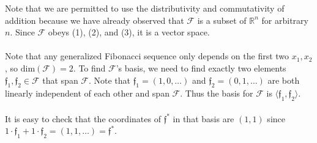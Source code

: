 \documentclass{article}
\begin{document}
Note that we are permitted to use the distributivity and commutativity of addition because we have already observed that $\mathcal{F}$ is a subset of $\mathbb{R}^{n}$ for arbitrary $n$. Since $\mathcal{F}$ obeys (1), (2), and (3), it is a vector space. \\\\
 Note that any generalized Fibonacci sequence only depends on the first two $x_{1},x_{2}$, so $\text{dim}(\mathcal{F}) = 2$. To find $\mathcal{F}$'s basis, we need to find exactly two elements $\mathfrak{f}_{1},\mathfrak{f}_{2} \in \mathcal{F}$ that span $\mathcal{F}$. Note that $\mathfrak{f}_{1} = (1, 0, \dots)$ and $\mathfrak{f}_{2} = (0, 1, \dots)$ are both linearly independent of each other and span $\mathcal{F}$. Thus the basis for $\mathcal{F}$ is $\langle \mathfrak{f}_{1}, \mathfrak{f}_{2}\rangle$. \\\\
 It is easy to check that the coordinates of $\mathfrak{f}^{*}$ in that basis are $(1,1)$ since $1\cdot\mathfrak{f}_{1} + 1\cdot\mathfrak{f}_{2} = (1,1, \dots) = \mathfrak{f}^{*}$. 
\newpage
\end{document}
